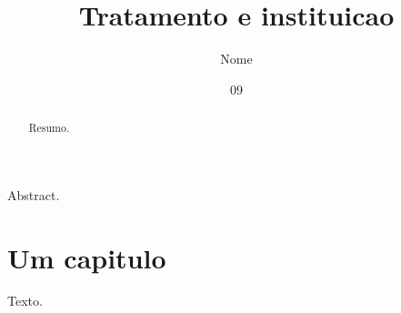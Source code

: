 \documentclass[dsc,orientadorexamina]{ufrj}
\title{Tratamento e instituicao}
\author{Nome}{Sobrenome}
\date{09}{2026}
\begin{document}
  \maketitle
  \frontmatter
  \begin{abstract}Resumo.\end{abstract}
  \begin{foreignabstract}Abstract.\end{foreignabstract}
  \tableofcontents
  \mainmatter
  \chapter{Um capitulo}
  Texto.
\end{document}
